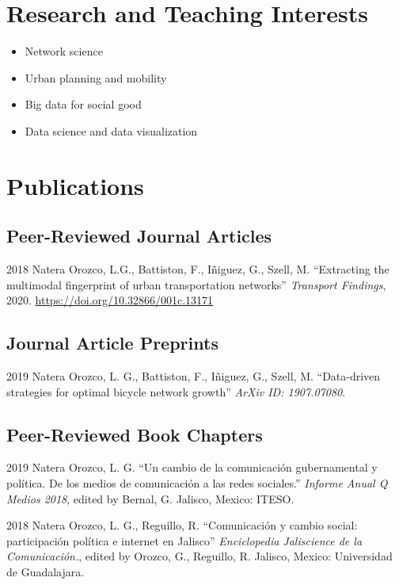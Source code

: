 \documentclass{academiccv}
\begin{document}
\section*{Research and Teaching Interests}
\begin{itemize}
	\item Network science
	\item Urban planning and mobility
	\item Big data for social good
	\item Data science and data visualization
\end{itemize}



\section*{Publications}
\subsection*{Peer-Reviewed Journal Articles}
\begin{tablist}
\item[2018] \tab Natera Orozco, L.G., Battiston, F., I\~niguez, G., Szell, M. \enquote{Extracting the multimodal fingerprint of urban transportation networks} \textit{Transport Findings}, 2020. \url{https://doi.org/10.32866/001c.13171}
\end{tablist}

\subsection*{Journal Article Preprints}
\begin{tablist}
	\item[2019] \tab Natera Orozco, L. G., Battiston, F., I\~niguez, G., Szell, M. \enquote{Data-driven strategies for optimal bicycle network growth} \textit{ArXiv ID: 1907.07080}. 
\end{tablist}

\subsection*{Peer-Reviewed Book Chapters}
\begin{tablist}
	\item[2019] \tab Natera Orozco, L. G. \enquote{Un cambio de la comunicación gubernamental y política. De los medios de comunicación a las redes sociales.} \textit{Informe Anual Q Medios 2018}, edited by Bernal, G. Jalisco, Mexico: ITESO.
	\item[2018] \tab Natera Orozco, L. G., Reguillo, R. \enquote{Comunicación y cambio social: participación política e internet en Jalisco} \textit{Enciclopedia Jaliscience de la Comunicación.}, edited by Orozco, G., Reguillo, R. Jalisco, Mexico: Universidad de Guadalajara.
\end{tablist}
\end{document}
